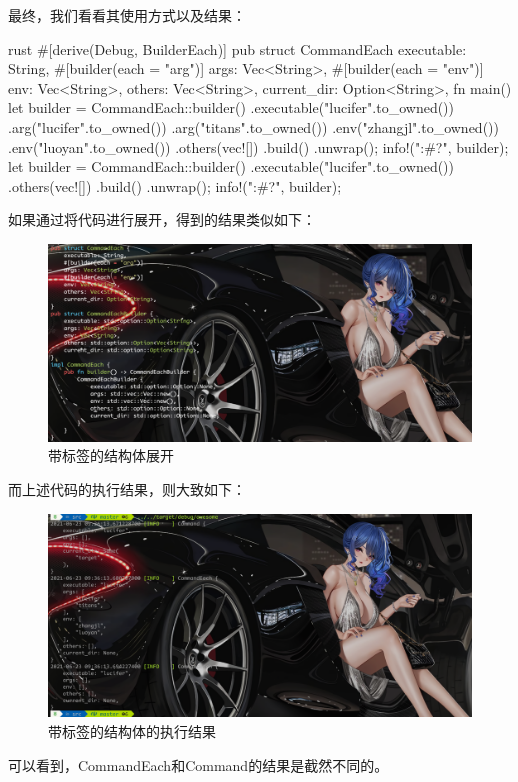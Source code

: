 最终，我们看看其使用方式以及结果：
\begin{code-block}{rust}
#[derive(Debug, BuilderEach)]
pub struct CommandEach {
    executable: String,
    #[builder(each = "arg")]
    args: Vec<String>,
    #[builder(each = "env")]
    env: Vec<String>,
    others: Vec<String>,
    current_dir: Option<String>,
}
fn main() {
    let builder = CommandEach::builder()
        .executable("lucifer".to_owned())
        .arg("lucifer".to_owned())
        .arg("titans".to_owned())
        .env("zhangjl".to_owned())
        .env("luoyan".to_owned())
        .others(vec![])
        .build()
        .unwrap();
    info!("{:#?}", builder);
    let builder = CommandEach::builder()
        .executable("lucifer".to_owned())
        .others(vec![])
        .build()
        .unwrap();
    info!("{:#?}", builder);
}
\end{code-block}

如果通过将代码进行展开，得到的结果类似如下：
\begin{figure}[H]
  \centering
  \includegraphics[width=\linewidth]{rust_label_expand.png}
  \caption{带标签的结构体展开}
  \label{fig:rust_label_expand}
\end{figure}
而上述代码的执行结果，则大致如下：
\begin{figure}[H]
  \centering
  \includegraphics[width=\linewidth]{rust_label_result.png}
  \caption{带标签的结构体的执行结果}
  \label{fig:rust_label_result}
\end{figure}
可以看到，CommandEach和Command的结果是截然不同的。


